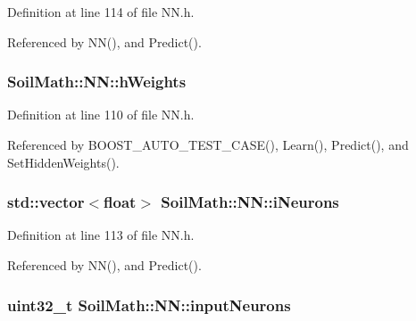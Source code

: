 Definition at line 114 of file N\+N.\+h.



Referenced by N\+N(), and Predict().

\hypertarget{class_soil_math_1_1_n_n_a46db1b2814215509a7345fccc8928efe}{}
\subsubsection[{h\+Weights}]{ Soil\+Math\+::\+N\+N\+::h\+Weights}\label{class_soil_math_1_1_n_n_a46db1b2814215509a7345fccc8928efe}


Definition at line 110 of file N\+N.\+h.



Referenced by B\+O\+O\+S\+T\+\_\+\+A\+U\+T\+O\+\_\+\+T\+E\+S\+T\+\_\+\+C\+A\+S\+E(), Learn(), Predict(), and Set\+Hidden\+Weights().

\hypertarget{class_soil_math_1_1_n_n_aa5a6a6014722338fb8af2f79d6187998}{}
\subsubsection[{i\+Neurons}]{\setlength{\rightskip}{0pt plus 5cm}std\+::vector$<$float$>$ Soil\+Math\+::\+N\+N\+::i\+Neurons\hspace{0.3cm}{\ttfamily [private]}}\label{class_soil_math_1_1_n_n_aa5a6a6014722338fb8af2f79d6187998}


Definition at line 113 of file N\+N.\+h.



Referenced by N\+N(), and Predict().

\hypertarget{class_soil_math_1_1_n_n_a51723ae01e9b0a95c9aa6ac4f4c569fc}{}
\subsubsection[{input\+Neurons}]{\setlength{\rightskip}{0pt plus 5cm}uint32\+\_\+t Soil\+Math\+::\+N\+N\+::input\+Neurons\hspace{0.3cm}{\ttfamily [private]}}\label{class_soil_math_1_1_n_n_a51723ae01e9b0a95c9aa6ac4f4c569fc}


